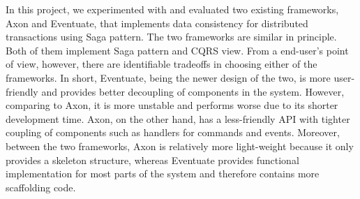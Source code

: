 In this project, we experimented with and evaluated two existing frameworks, Axon and Eventuate, that implements data consistency for distributed transactions using Saga pattern. The two frameworks are similar in principle. Both of them implement Saga pattern and CQRS view. From a end-user’s point of view, however, there are identifiable tradeoffs in choosing either of the frameworks. In short, Eventuate, being the newer design of the two, is more user-friendly and provides better decoupling of components in the system. However, comparing to Axon, it is more unstable and performs worse due to its shorter development time. Axon, on the other hand, has a less-friendly API with tighter coupling of components such as handlers for commands and events. Moreover, between the two frameworks, Axon is relatively more light-weight because it only provides a skeleton structure, whereas Eventuate provides functional implementation for most parts of the system and therefore contains more scaffolding code.
